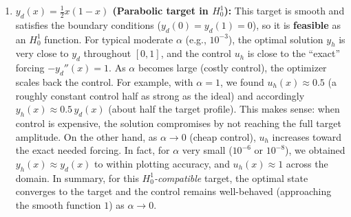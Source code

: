 \documentclass[a4paper,10pt]{report}
\begin{document}
\begin{enumerate}
	\item \textbf{\(y_d(x)=\frac{1}{2}x(1-x)\) (Parabolic target in \(H^1_0\)):} This target is smooth and satisfies the boundary conditions (\(y_d(0)=y_d(1)=0\)), so it is \textbf{feasible} as an \(H^1_0\) function. For typical moderate \(\alpha\) (e.g., \(10^{-3}\)), the optimal solution \(y_h\) is very close to \(y_d\) throughout \([0,1]\), and the control \(u_h\) is close to the “exact” forcing \(-y_d''(x)=1\). As \(\alpha\) becomes large (costly control), the optimizer scales back the control. For example, with \(\alpha=1\), we found \(u_h(x)\approx 0.5\) (a roughly constant control half as strong as the ideal) and accordingly \(y_h(x)\approx 0.5\,y_d(x)\) (about half the target profile). This makes sense: when control is expensive, the solution compromises by not reaching the full target amplitude. On the other hand, as \(\alpha\to 0\) (cheap control), \(u_h\) increases toward the exact needed forcing. In fact, for \(\alpha\) very small (\(10^{-6}\) or \(10^{-8}\)), we obtained \(y_h(x)\approx y_d(x)\) to within plotting accuracy, and \(u_h(x)\approx 1\) across the domain. In summary, for this \textit{\(H^1_0\)-compatible} target, the optimal state converges to the target and the control remains well-behaved (approaching the smooth function \(1\)) as \(\alpha\to 0\).


\end{enumerate}
\end{document}
